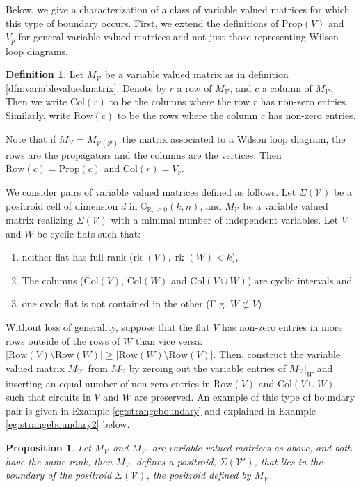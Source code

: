 \documentclass[11pt]{article}
\newcommand{\R}{\mathbb{R}}
\newcommand{\Gr}{\mathbb{G}_{\R, \geq 0}}
\newcommand{\rk}{\textrm{rk }}
\newcommand{\cP}{\mathcal{P}}
\newcommand{\cV}{\mathcal{V}}
\newcommand{\VP}{\cV(\cP)}
\newcommand{\Prop}{\textrm{Prop}}
\newcommand{\Rows}{\textrm{Row}}
\newcommand{\Cols}{\textrm{Col}}
\newtheorem{prop}[thm]{Proposition}
\theoremstyle{remark}
\theoremstyle{definition}
\newtheorem{dfn}[thm]{Definition}
\begin{document}
Below, we give a characterization of a class of variable valued matrices for which this type of boundary occurs. First, we extend the definitions of $\Prop(V)$ and $V_p$ for general variable valued matrices and not just those representing Wilson loop diagrams.

\begin{dfn}
Let $M_{\mathcal{V}}$ be a variable valued matrix as in definition \ref{dfn:variablevaluedmatrix}. Denote by $r$ a row of $M_{\cV}$, and $c$ a column of $M_{\cV}$. Then we write $\Cols(r)$ to be the columns where the row $r$ has non-zero entries. Similarly, write $\Rows(c)$ to be the rows where the column $c$ has non-zero entries. 
\end{dfn}

Note that if $M_{\mathcal{V}} = M_{\VP}$ the matrix associated to a Wilson loop diagram, the rows are the propagators and the columns are the vertices. Then $\Rows(c) = \Prop(c)$ and $\Cols(r) = V_r$.

We consider pairs of variable valued matrices defined as follows. Let $\Sigma(\cV)$ be a positroid cell of dimension $d$ in $\Gr(k,n)$, and $M_\cV$ be a variable valued matrix realizing $\Sigma(\cV)$ with a minimal number of independent variables. Let $V$ and $W$ be cyclic flats such that: \begin{enumerate} \item neither flat has full rank ($\rk (V), \; \rk(W) <k$), \item  The columns ($\Cols(V)$, $\Cols(W)$ and $\Cols(V \cup W)$) are cyclic intervals and \item one cyclc flat is not contained in the other (E.g. $W \not \subset V$) \end{enumerate}  Without loss of generality, suppose that the flat $V$ has non-zero entries in more rows outside of the rows of $W$ than vice versa: $|\Rows(V) \setminus \Rows(W)| \geq |\Rows(W) \setminus \Rows(V)|$. Then, construct the variable valued matrix $M_{\cV'}$ from $M_\cV$ by zeroing out the variable entries of $M_\cV|_{W}$ and inserting an equal number of non zero entries in $\Rows(V)$ and $\Cols(V\cup W)$ such that circuits in $V$ and $W$ are preserved. An example of this type of boundary pair is given in Example \ref{eg:strangeboundary} and explained in Example \ref{eg:strangeboundary2} below.


\begin{prop}\label{res:moving variables}
Let $M_\cV$ and $M_{\cV'}$ are variable valued matrices as above, and both have the same rank, then $M_{\cV'}$ defines a positroid, $\Sigma(\cV')$, that lies in the boundary of the positroid $\Sigma(\cV)$, the positroid defined by $M_\cV$. \end{prop}
\end{document}
